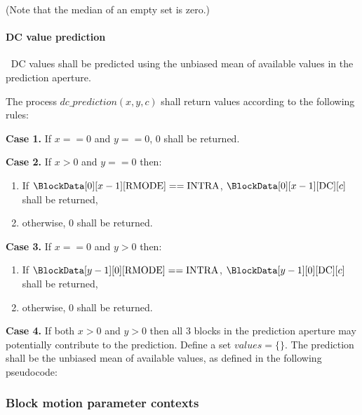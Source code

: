 (Note that the median of an empty set is zero.)

\paragraph{DC value prediction}
\label{dcprediction}
$\ $\newline
DC values shall be predicted using the unbiased mean of available values 
in the prediction aperture. 

The process $dc\_prediction(x, y, c)$ shall return values according to
the following rules:

{\bf Case 1.}  If $x==0$ and $y==0$, $0$ shall be returned.

{\bf Case 2.} If $x>0$ and $y==0$ then:
\begin{enumerate}
   \item If $\BlockData[0][x-1][\RMode]==\Intra$, $\BlockData[0][x-1][\DC][c]$ 
shall be returned,
   \item otherwise, $0$ shall be returned.
\end{enumerate}

{\bf Case 3.} If $x==0$ and $y>0$ then:
\begin{enumerate}
   \item If $\BlockData[y-1][0][\RMode]==\Intra$, $\BlockData[y-1][0][\DC][c]$
shall be returned,
   \item otherwise, 0 shall be returned.
\end{enumerate}

{\bf Case 4.} If both $x>0$ and $y>0$ then all 3 blocks in the prediction aperture may
 potentially contribute to the prediction. Define a set $values=\{\}$. The prediction shall
be the unbiased mean of available values, as defined in the following pseudocode:

\begin{pseudo*}
    \bsIF{\BlockData[y][x-1][\RMode]==\Intra}
    \bsEND
    \bsIF{\BlockData[y-1][x][\RMode]==\Intra}
    \bsEND
    \bsIF{\BlockData[y-1][x-1][\RMode]==\Intra}
    \bsEND
    \bsELSE
    \bsEND
\bsEND
\end{pseudo*}

\subsubsection{Block motion parameter contexts}

